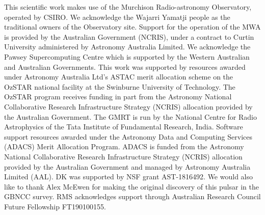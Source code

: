 \documentclass[twocolumn]{aastex631}
\begin{document}
\begin{acknowledgements}
This scientific work makes use of the Murchison Radio-astronomy Observatory, operated by CSIRO. We acknowledge the Wajarri Yamatji people as the traditional owners of the Observatory site. Support for the operation of the MWA is provided by the Australian Government (NCRIS), under a contract to Curtin University administered by Astronomy Australia Limited.
We acknowledge the Pawsey Supercomputing Centre which is supported by the Western Australian and Australian Governments.
This work was supported by resources awarded under Astronomy Australia Ltd's ASTAC merit allocation scheme on the OzSTAR national facility at the Swinburne University of Technology. The OzSTAR program receives funding in part from the Astronomy National Collaborative Research Infrastructure Strategy (NCRIS) allocation provided by the Australian Government.
The GMRT is run by the National Centre for Radio Astrophysics
of the Tata Institute of Fundamental Research, India.
Software support resources awarded under the Astronomy Data and Computing Services (ADACS) Merit Allocation Program.
ADACS is funded from the Astronomy National Collaborative Research Infrastructure Strategy (NCRIS) allocation provided by the Australian Government and managed by Astronomy Australia Limited (AAL).
DK was supported by NSF grant AST-1816492.
We would also like to thank Alex McEwen for making the original discovery of this pulsar in the GBNCC survey.
RMS acknowledges support through Australian Research Council Future Fellowship FT190100155.
\end{acknowledgements}

{}



\end{document}
